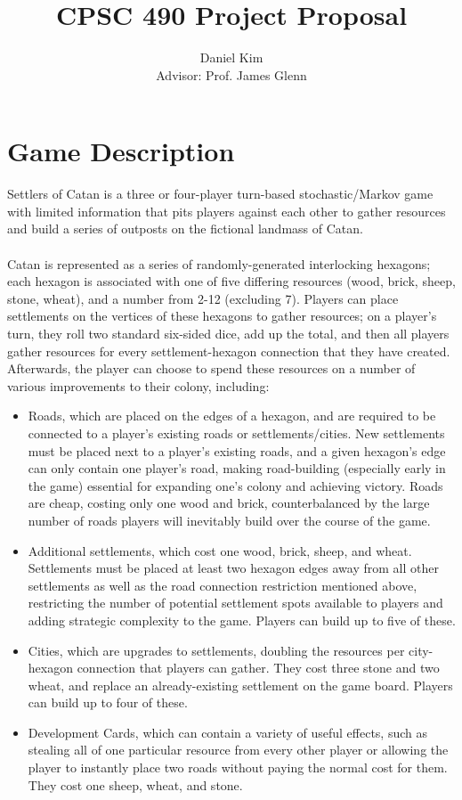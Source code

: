 \documentclass[a4paper, 11pt]{article}
\title{CPSC 490 Project Proposal}
\author{Daniel Kim\\{Advisor: Prof. James Glenn}}
\begin{document}
\maketitle

\section{Game Description}

Settlers of Catan is a three or four-player turn-based stochastic/Markov game with limited information that pits players against each other to gather resources and build a series of outposts on the fictional landmass of Catan. 
\\ \\
\noindent Catan is represented as a series of randomly-generated interlocking hexagons; each hexagon is associated with one of five differing resources (wood, brick, sheep, stone, wheat), and a number from 2-12 (excluding 7). Players can place settlements on the vertices of these hexagons to gather resources; on a player's turn, they roll two standard six-sided dice, add up the total, and then all players gather resources for every settlement-hexagon connection that they have created. Afterwards, the player can choose to spend these resources on a number of various improvements to their colony, including:

\begin{itemize}
	\item Roads, which are placed on the edges of a hexagon, and are required to be connected to a player's existing roads or settlements/cities. New settlements must be placed next to a player's existing roads, and a given hexagon's edge can only contain one player's road, making road-building (especially early in the game) essential for expanding one's colony and achieving victory. Roads are cheap, costing only one wood and brick, counterbalanced by the large number of roads players will inevitably build over the course of the game.
	\item Additional settlements, which cost one wood, brick, sheep, and wheat. Settlements must be placed at least two hexagon edges away from all other settlements as well as the road connection restriction mentioned above, restricting the number of potential settlement spots available to players and adding strategic complexity to the game. Players can build up to five of these.
	\item Cities, which are upgrades to settlements, doubling the resources per city-hexagon connection that players can gather. They cost three stone and two wheat, and replace an already-existing settlement on the game board. Players can build up to four of these.
	\item Development Cards, which can contain a variety of useful effects, such as stealing all of one particular resource from every other player or allowing the player to instantly place two roads without paying the normal cost for them. They cost one sheep, wheat, and stone.
\end{itemize}
\end{document}
